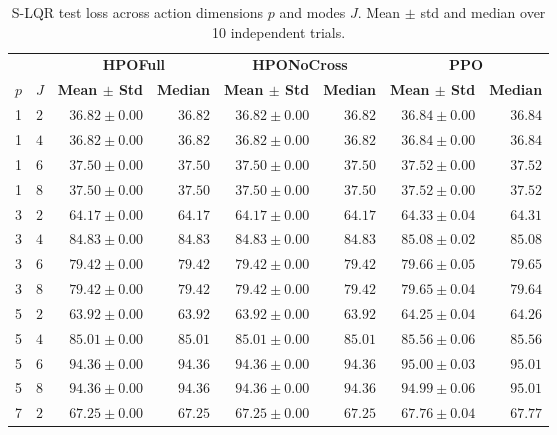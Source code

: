 \documentclass{article}
\theoremstyle{definition}
\theoremstyle{remark}
\begin{document}
\begin{table}[ht]
  \centering
  \small
  \caption{S-LQR test loss across action dimensions $p$ and modes $J$. Mean $\pm$ std and median over 10 independent trials.}
  \label{tab:lqr-results}
  \begin{tabular}{llrrrrrr}
    \toprule
     &  & \multicolumn{2}{c}{\textbf{HPOFull}} & \multicolumn{2}{c}{\textbf{HPONoCross}} & \multicolumn{2}{c}{\textbf{PPO}} \\
    \cmidrule(lr){3-4} \cmidrule(lr){5-6} \cmidrule(lr){7-8}
    \textbf{$p$} & \textbf{$J$} & \textbf{Mean $\pm$ Std} & \textbf{Median} & \textbf{Mean $\pm$ Std} & \textbf{Median} & \textbf{Mean $\pm$ Std} & \textbf{Median} \\
    \midrule
    1 & $2$ & $36.82 \pm 0.00$ & $36.82$ & $36.82 \pm 0.00$ & $36.82$ & $36.84 \pm 0.00$ & $36.84$ \\
    1 & $4$ & $36.82 \pm 0.00$ & $36.82$ & $36.82 \pm 0.00$ & $36.82$ & $36.84 \pm 0.00$ & $36.84$ \\
    1 & $6$ & $37.50 \pm 0.00$ & $37.50$ & $37.50 \pm 0.00$ & $37.50$ & $37.52 \pm 0.00$ & $37.52$ \\
    1 & $8$ & $37.50 \pm 0.00$ & $37.50$ & $37.50 \pm 0.00$ & $37.50$ & $37.52 \pm 0.00$ & $37.52$ \\
    3 & $2$ & $64.17 \pm 0.00$ & $64.17$ & $64.17 \pm 0.00$ & $64.17$ & $64.33 \pm 0.04$ & $64.31$ \\
    3 & $4$ & $84.83 \pm 0.00$ & $84.83$ & $84.83 \pm 0.00$ & $84.83$ & $85.08 \pm 0.02$ & $85.08$ \\
    3 & $6$ & $79.42 \pm 0.00$ & $79.42$ & $79.42 \pm 0.00$ & $79.42$ & $79.66 \pm 0.05$ & $79.65$ \\
    3 & $8$ & $79.42 \pm 0.00$ & $79.42$ & $79.42 \pm 0.00$ & $79.42$ & $79.65 \pm 0.04$ & $79.64$ \\
    5 & $2$ & $63.92 \pm 0.00$ & $63.92$ & $63.92 \pm 0.00$ & $63.92$ & $64.25 \pm 0.04$ & $64.26$ \\
    5 & $4$ & $85.01 \pm 0.00$ & $85.01$ & $85.01 \pm 0.00$ & $85.01$ & $85.56 \pm 0.06$ & $85.56$ \\
    5 & $6$ & $94.36 \pm 0.00$ & $94.36$ & $94.36 \pm 0.00$ & $94.36$ & $95.00 \pm 0.03$ & $95.01$ \\
    5 & $8$ & $94.36 \pm 0.00$ & $94.36$ & $94.36 \pm 0.00$ & $94.36$ & $94.99 \pm 0.06$ & $95.01$ \\
    7 & $2$ & $67.25 \pm 0.00$ & $67.25$ & $67.25 \pm 0.00$ & $67.25$ & $67.76 \pm 0.04$ & $67.77$ \\

\end{tabular}
\end{table}
\end{document}
